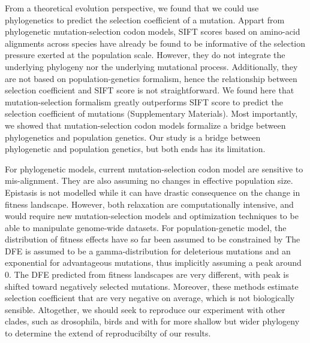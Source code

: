 \documentclass{article}
\begin{document}
    From a theoretical evolution perspective, we found that we could use phylogenetics to predict the selection coefficient of a mutation.
    Appart from phylogenetic mutation-selection codon models, SIFT scores based on amino-acid alignments across species have already be found to be informative of the selection pressure exerted at the population scale\cite{chen_hunting_2021}.
    However, they do not integrate the underlying phylogeny nor the underlying mutational process.
    Additionally, they are not based on population-genetics formalism, hence the relationship between selection coefficient and SIFT score is not straightforward.
    We found here that mutation-selection formalism greatly outperforms SIFT score to predict the selection coefficient of mutations (Supplementary Materials).
    Most importantly, we showed that mutation-selection codon models formalize a bridge between phylogenetics and population genetics.
    Our study is a bridge between phylogenetic and population genetics, but both ends has its limitation.

    For phylogenetic models, current mutation-selection codon model are sensitive to mis-alignment.
    They are also assuming no changes in effective population size\cite{latrille_inferring_2021}.
    Epistasis is not modelled while it can have drastic consequence on the change in fitness landscape\cite{latrille_quantifying_2021}.
    However, both relaxation are computationally intensive, and would require new mutation-selection models and optimization techniques to be able to manipulate genome-wide datasets.
    For population-genetic model, the distribution of fitness effects have so far been assumed to be constrained by
    The DFE is assumed to be a gamma-distribution for deleterious mutations and an exponential for advantageous mutations, thus implicitly assuming a peak around 0.
    The DFE predicted from fitness landscapes are very different, with peak is shifted toward negatively selected mutations.
    Moreover, these methods estimate selection coefficient that are very negative on average, which is not biologically sensible.
    Altogether, we should seek to reproduce our experiment with other clades, such as drosophila, birds and with for more shallow but wider phylogeny to determine the extend of reproducibilty of our results.
\end{document}
